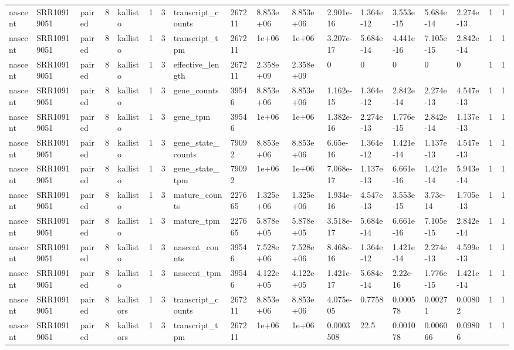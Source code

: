 \begin{tabular}{llllllllllllllllll}
nascent & SRR10919051 & paired & 8 & kallisto & 1 & 3 & transcript\_counts & 267211 & 8.853e+06 & 8.853e+06 & 2.901e-16 & 1.364e-12 & 3.553e-15 & 5.684e-14 & 2.274e-13 & 1 & 1 \\
nascent & SRR10919051 & paired & 8 & kallisto & 1 & 3 & transcript\_tpm & 267211 & 1e+06 & 1e+06 & 3.207e-17 & 5.684e-14 & 4.441e-16 & 7.105e-15 & 2.842e-14 & 1 & 1 \\
nascent & SRR10919051 & paired & 8 & kallisto & 1 & 3 & effective\_length & 267211 & 2.358e+09 & 2.358e+09 & 0 & 0 & 0 & 0 & 0 & 1 & 1 \\
nascent & SRR10919051 & paired & 8 & kallisto & 1 & 3 & gene\_counts & 39546 & 8.853e+06 & 8.853e+06 & 1.162e-15 & 1.364e-12 & 2.842e-14 & 2.274e-13 & 4.547e-13 & 1 & 1 \\
nascent & SRR10919051 & paired & 8 & kallisto & 1 & 3 & gene\_tpm & 39546 & 1e+06 & 1e+06 & 1.382e-16 & 2.274e-13 & 1.776e-15 & 2.842e-14 & 1.137e-13 & 1 & 1 \\
nascent & SRR10919051 & paired & 8 & kallisto & 1 & 3 & gene\_state\_counts & 79092 & 8.853e+06 & 8.853e+06 & 6.65e-16 & 1.364e-12 & 1.421e-14 & 1.137e-13 & 4.547e-13 & 1 & 1 \\
nascent & SRR10919051 & paired & 8 & kallisto & 1 & 3 & gene\_state\_tpm & 79092 & 1e+06 & 1e+06 & 7.068e-17 & 1.137e-13 & 6.661e-16 & 1.421e-14 & 5.943e-14 & 1 & 1 \\
nascent & SRR10919051 & paired & 8 & kallisto & 1 & 3 & mature\_counts & 227665 & 1.325e+06 & 1.325e+06 & 1.934e-16 & 4.547e-13 & 3.553e-15 & 3.73e-14 & 1.705e-13 & 1 & 1 \\
nascent & SRR10919051 & paired & 8 & kallisto & 1 & 3 & mature\_tpm & 227665 & 5.878e+05 & 5.878e+05 & 3.518e-17 & 5.684e-14 & 6.661e-16 & 7.105e-15 & 2.842e-14 & 1 & 1 \\
nascent & SRR10919051 & paired & 8 & kallisto & 1 & 3 & nascent\_counts & 39546 & 7.528e+06 & 7.528e+06 & 8.468e-16 & 1.364e-12 & 1.421e-14 & 2.274e-13 & 4.599e-13 & 1 & 1 \\
nascent & SRR10919051 & paired & 8 & kallisto & 1 & 3 & nascent\_tpm & 39546 & 4.122e+05 & 4.122e+05 & 1.421e-17 & 5.684e-14 & 2.22e-16 & 1.776e-15 & 1.421e-14 & 1 & 1 \\
nascent & SRR10919051 & paired & 8 & kallistors & 1 & 3 & transcript\_counts & 267211 & 8.853e+06 & 8.853e+06 & 4.075e-05 & 0.7758 & 0.000578 & 0.00271 & 0.00802 & 1 & 1 \\
nascent & SRR10919051 & paired & 8 & kallistors & 1 & 3 & transcript\_tpm & 267211 & 1e+06 & 1e+06 & 0.0003508 & 22.5 & 0.001078 & 0.006066 & 0.09806 & 1 & 1 \\

\end{tabular}
